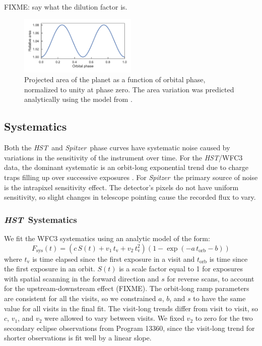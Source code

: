 \documentclass[twocolumn]{aastex61}
\newcommand{\project}[1]{\textsl{#1}}
\newcommand{\HST}{\project{HST}}
\newcommand{\Spitzer}{\project{Spitzer}}
\begin{document}
FIXME: say what the dilution factor is.

\begin{figure}
\includegraphics[width = 0.5\textwidth]{Figures/ellipsoidal.pdf}
\caption{Projected area of the planet as a function of orbital phase, normalized to unity at phase zero. The area variation was predicted analytically using the model from \citep{leconte11b}.}
\label{fig:ellipsoidal}
\end{figure}


\subsection{Systematics}
Both the \HST\ and \Spitzer\ phase curves have systematic noise caused by variations in the sensitivity of the instrument over time. For the \HST/WFC3 data, the dominant systematic is an orbit-long exponential trend due to charge traps filling up over successive exposures \citep{long15, zhu17}. For \Spitzer\, the primary source of noise is the intrapixel sensitivity effect. The detector's pixels do not have uniform sensitivity, so slight changes in telescope pointing cause the recorded flux to vary. 

\subsubsection{\HST\ Systematics}
\label{sec:hst_sys}
We fit the WFC3 systematics using an analytic model of the form:
\begin{equation}
 F_\mathrm{sys}(t) = (c\,S(t) + v_1\,t_\mathrm{v} + v_2\,t_\mathrm{v}^2)(1 - \exp(-a\,t_\mathrm{orb} - b))
\end{equation}
where $t_\mathrm{v}$ is time elapsed since the first exposure in a visit and $t_\mathrm{orb}$ is time since the first exposure in an orbit. $S(t)$ is a scale factor equal to 1 for exposures with spatial scanning in the forward direction and $s$ for reverse scans, to account for the upstream-downstream effect (FIXME). The orbit-long ramp parameters are consistent for all the visits, so we constrained $a$, $b$, and $s$ to have the same value for all visits in the final fit. The visit-long trends differ from visit to visit, so $c$, $v_1$, and $v_2$ were allowed to vary between visits. We fixed $v_2$ to zero for the two secondary eclipse observations from Program 13360, since the visit-long trend for shorter observations is fit well by a linear slope.
\end{document}
